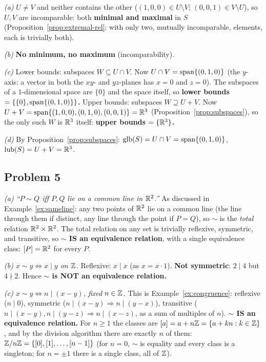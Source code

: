 \emph{(a)} $U\ne V$ and neither contains the other ($(1,0,0)\in U\setminus V$; $(0,0,1)\in V\setminus U$), so $U,V$ are incomparable: both \textbf{minimal and maximal} in $S$ (Proposition~\ref{prop:extremal-rel}: with only two, mutually incomparable, elements, each is trivially both).

\emph{(b)} \textbf{No minimum, no maximum} (incomparability).

\emph{(c)} Lower bounds: subspaces $W\subseteq U\cap V$. Now $U\cap V=\operatorname{span}\{(0,1,0)\}$ (the $y$-axis: a vector in both the $xy$- and $yz$-planes has $x=0$ and $z=0$). The subspaces of a $1$-dimensional space are $\{0\}$ and the space itself, so \textbf{lower bounds $=\{\{0\},\operatorname{span}\{(0,1,0)\}\}$.} Upper bounds: subspaces $W\supseteq U+V$. Now $U+V=\operatorname{span}\{(1,0,0),(0,1,0),(0,0,1)\}=\mathbb{R}^3$ (Proposition~\ref{prop:subspaces}), so the only such $W$ is $\mathbb{R}^3$ itself: \textbf{upper bounds $=\{\mathbb{R}^3\}$.}

\emph{(d)} By Proposition~\ref{prop:subspaces}: $\operatorname{glb}(S)=U\cap V=\operatorname{span}\{(0,1,0)\}$, $\operatorname{lub}(S)=U+V=\mathbb{R}^3$.

\subsection*{Problem 5}
\emph{(a) ``$P\sim Q$ iff $P,Q$ lie on a common line in $\mathbb{R}^2$.''} As discussed in Example~\ref{ex:sameline}: any two points of $\mathbb{R}^2$ lie on a common line (the line through them if distinct, any line through the point if $P=Q$), so $\sim$ is the \emph{total} relation $\mathbb{R}^2\times\mathbb{R}^2$. The total relation on any set is trivially reflexive, symmetric, and transitive, so \textbf{$\sim$ IS an equivalence relation}, with a single equivalence class: $[P]=\mathbb{R}^2$ for every $P$.

\emph{(b) $x\sim y\iff x\mid y$ on $\mathbb{Z}$.} Reflexive: $x\mid x$ (as $x=x\cdot1$). \textbf{Not symmetric}: $2\mid4$ but $4\nmid2$. Hence \textbf{$\sim$ is NOT an equivalence relation.}

\emph{(c) $x\sim y\iff n\mid(x-y)$, fixed $n\in\mathbb{Z}$.} This is Example~\ref{ex:congruence}: reflexive ($n\mid0$), symmetric ($n\mid(x-y)\Rightarrow n\mid(y-x)$), transitive ($n\mid(x-y),n\mid(y-z)\Rightarrow n\mid(x-z)$, as a sum of multiples of $n$). \textbf{$\sim$ IS an equivalence relation.} For $n\ge1$ the classes are $[a]=a+n\mathbb{Z}=\{a+kn:k\in\mathbb{Z}\}$, and by the division algorithm there are exactly $n$ of them: $\mathbb{Z}/n\mathbb{Z}=\{[0],[1],\dots,[n-1]\}$ (for $n=0$, $\sim$ is equality and every class is a singleton; for $n=\pm1$ there is a single class, all of $\mathbb{Z}$).

